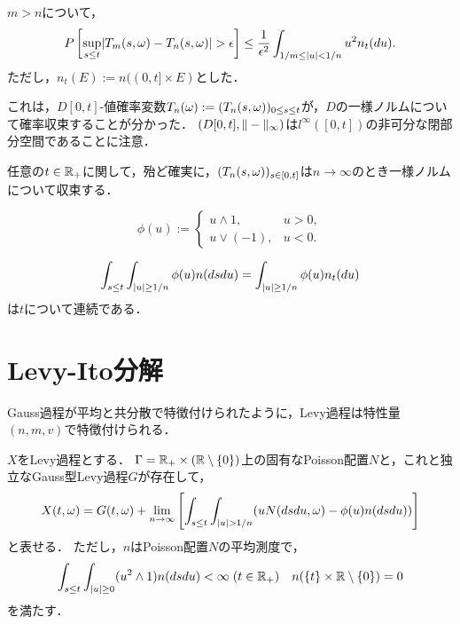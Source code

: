 \documentclass[uplatex,dvipdfmx]{jsreport}
\begin{document}
\begin{lemma}
    $m>n$について，
    \[P\left[\sup_{s\le t}\lvert T_m(s,\omega)-T_n(s,\omega)\rvert>\epsilon\right]\le\frac{1}{\epsilon^2}\int_{1/m\le\lvert u\rvert<1/n}u^2n_t(du).\]
    ただし，$n_t(E):=n((0,t]\times E)$とした．
\end{lemma}
\begin{remarks}
    これは，$D[0,t]$-値確率変数$T_n(\omega):=(T_n(s,\omega))_{0\le s\le t}$が，$D$の一様ノルムについて確率収束することが分かった．
    $(D[0,t],\|-\|_\infty)$は$l^\infty([0,t])$の非可分な閉部分空間であることに注意．
\end{remarks}

\begin{lemma}[Banach空間値確率変数の概収束性]
    任意の$t\in\mathbb{R}_+$に関して，殆ど確実に，$(T_n(s,\omega))_{s\in[0,t]}$は$n\to\infty$のとき一様ノルムについて収束する．
\end{lemma}

\begin{notation}
    \[\phi(u):=\begin{cases}
        u\land 1,&u>0,\\
        u\lor(-1),&u<0.
    \end{cases}\]
\end{notation}

\begin{lemma}
    \[\int_{s\le t}\int_{\lvert u\rvert\ge 1/n}\phi(u)n(dsdu)=\int_{\lvert u\rvert\ge 1/n}\phi(u)n_t(du)\]
    は$t$について連続である．
\end{lemma}

\section{Levy-Ito分解}

\begin{tcolorbox}[colframe=ForestGreen, colback=ForestGreen!10!white,breakable,colbacktitle=ForestGreen!40!white,coltitle=black,fonttitle=\bfseries\sffamily,
title=]
    Gauss過程が平均と共分散で特徴付けられたように，Levy過程は特性量$(n,m,v)$で特徴付けられる．
\end{tcolorbox}

\begin{theorem}
    $X$をLevy過程とする．
    $\Gamma=\mathbb{R}_+\times(\mathbb{R}\setminus\{0\})$上の固有なPoisson配置$N$と，これと独立なGauss型Levy過程$G$が存在して，
    \[X(t,\omega)=G(t,\omega)+\lim_{n\to\infty}\left[\int_{s\le t}\int_{\lvert u\rvert>1/n}(uN(dsdu,\omega)-\phi(u)n(dsdu))\right]\]
    と表せる．
    ただし，$n$はPoisson配置$N$の平均測度で，
    \[\int_{s\le t}\int_{\lvert u\rvert\ge0}(u^2\land 1)n(dsdu)<\infty\;(t\in\mathbb{R}_+)\quad n(\{t\}\times\mathbb{R}\setminus\{0\})=0\]
    を満たす．
\end{theorem}
\end{document}
